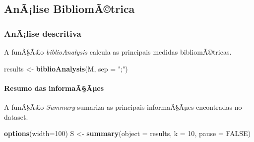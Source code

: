 \documentclass[]{article}
\newenvironment{Shaded}{\begin{snugshade}}{\end{snugshade}}
\newcommand{\KeywordTok}[1]{\textcolor[rgb]{0.13,0.29,0.53}{\textbf{#1}}}
\newcommand{\DataTypeTok}[1]{\textcolor[rgb]{0.13,0.29,0.53}{#1}}
\newcommand{\DecValTok}[1]{\textcolor[rgb]{0.00,0.00,0.81}{#1}}
\newcommand{\StringTok}[1]{\textcolor[rgb]{0.31,0.60,0.02}{#1}}
\newcommand{\OtherTok}[1]{\textcolor[rgb]{0.56,0.35,0.01}{#1}}
\newcommand{\NormalTok}[1]{#1}
\let\oldparagraph\paragraph
\renewcommand{\paragraph}[1]{\oldparagraph{#1}\mbox{}}
\begin{document}
\subsection{\texorpdfstring{\textbf{AnÃ¡lise
BibliomÃ©trica}}{AnÃ¡lise BibliomÃ©trica}}\label{analise-bibliomatrica}

\subsubsection{AnÃ¡lise descritiva}\label{analise-descritiva}

A funÃ§Ã£o \emph{biblioAnalysis} calcula as principais medidas
bibliomÃ©tricas.

\begin{Shaded}
\begin{Highlighting}[]
\NormalTok{results <-}\StringTok{ }\KeywordTok{biblioAnalysis}\NormalTok{(M, }\DataTypeTok{sep =} \StringTok{";"}\NormalTok{)}
\end{Highlighting}
\end{Shaded}

\paragraph{Resumo das informaÃ§Ãµes}\label{resumo-das-informaaaes}

A funÃ§Ã£o \emph{Summary} sumariza as principais informaÃ§Ãµes
encontradas no dataset.

\begin{Shaded}
\begin{Highlighting}[]
\KeywordTok{options}\NormalTok{(}\DataTypeTok{width=}\DecValTok{100}\NormalTok{)}
\NormalTok{S <-}\StringTok{ }\KeywordTok{summary}\NormalTok{(}\DataTypeTok{object =}\NormalTok{ results, }\DataTypeTok{k =} \DecValTok{10}\NormalTok{, }\DataTypeTok{pause =} \OtherTok{FALSE}\NormalTok{)}
\end{Highlighting}
\end{Shaded}
\end{document}
